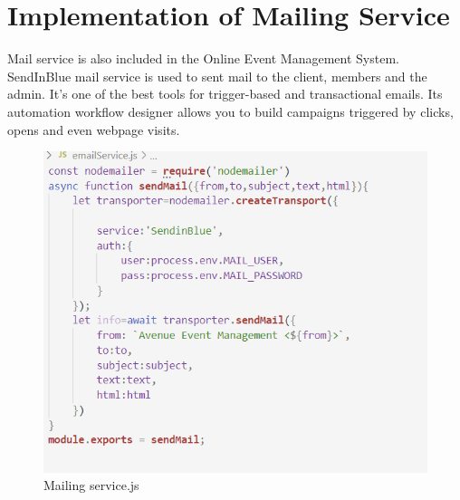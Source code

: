 \section{ Implementation of Mailing Service   }

\hspace{.2cm} 
Mail service is also included in the Online Event Management System. SendInBlue mail service is used to sent mail to the client, members and the admin. It's one of the best tools for trigger-based and transactional emails. Its automation workflow designer allows you to build campaigns triggered by clicks, opens and even webpage visits.

\begin{figure}[h]
	\centering
	\includegraphics[scale=0.5]{mailservice.png}
	\caption{ Mailing service.js }
	\label{ Mailing service.js }
\end{figure}




 


\\\\



\\\\
